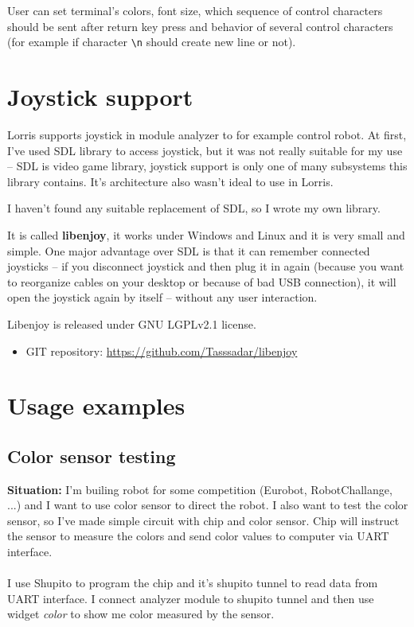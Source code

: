 \documentclass[12pt, a4paper, oneside]{article}
\newcommand{\It}{\textit}  %
\begin{document}
User can set terminal's colors, font size, which sequence of control characters should be sent after return key press and behavior of several control characters (for example if character \verb|\n| should create new line or not).

\newpage
\section{Joystick support}
Lorris supports joystick in module analyzer to for example control robot. At first, I've used SDL\cite{sdl} library to access joystick, but it was not really suitable for my use -- SDL is video game library, joystick support is only one of many subsystems this library contains. It's architecture also wasn't ideal to use in Lorris.

I haven't found any suitable replacement of SDL, so I wrote my own library.

It is called {\bf libenjoy}, it works under Windows and Linux and it is very small and simple. One major advantage over SDL is that it can remember connected joysticks -- if you disconnect joystick and then plug it in again (because you want to reorganize cables on your desktop or because of bad USB connection), it will open the joystick again by itself -- without any user interaction.

Libenjoy is released under GNU LGPLv2.1\cite{lgpl} license.
\begin{itemize}
\item GIT repository: \url{https://github.com/Tasssadar/libenjoy}
\end{itemize}

\newpage
\section{Usage examples}
\subsection{Color sensor testing}
{\bf Situation:} I'm builing robot for some competition (Eurobot, RobotChallange, ...) and I want to use color sensor to direct the robot. I also want to test the color sensor, so I've made simple circuit with chip and color sensor. Chip will instruct the sensor to measure the colors and send color values to computer via UART interface.\\
\\
 I use Shupito to program the chip and it's shupito tunnel to read data from UART interface. I connect analyzer module to shupito tunnel and then use widget \It{color} to show me color measured by the sensor.
\end{document}
